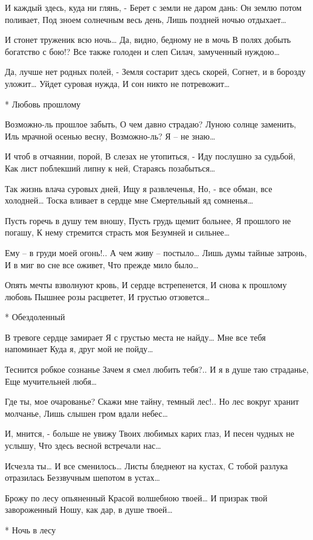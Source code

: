 И каждый здесь, куда ни глянь, -
Берет с земли не даром дань:
Он землю потом поливает,
Под зноем солнечным весь день,
Лишь поздней ночью отдыхает…

И стонет труженик всю ночь…
Да, видно, бедному не в мочь
В полях добыть богатство с бою!?
Все также голоден и слеп
Силач, замученный нуждою…

Да, лучше нет родных полей, -
Земля состарит здесь скорей,
Согнет, и в борозду уложит…
Уйдет суровая нужда,
И сон никто не потревожит…


* Любовь прошлому

Возможно-ль прошлое забыть,
О чем давно страдаю?
Луною солнце заменить,
Иль мрачной осенью весну,
Возможно-ль? Я – не знаю…

И чтоб в отчаянии, порой,
В слезах не утопиться, -
Иду послушно за судьбой,
Как лист поблекший липну к ней,
Стараясь позабыться…

Так жизнь влача суровых дней,
Ищу я развлеченья,
Но, - все обман, все холодней…
Тоска вливает в сердце мне
Смертельный яд сомненья…

Пусть горечь в душу тем вношу,
Пусть грудь щемит больнее,
Я прошлого не погашу,
К нему стремится страсть моя
Безумней и сильнее…

Ему – в груди моей огонь!..
А чем живу – постыло…
Лишь думы тайные затронь,
И в миг во сне все оживет,
Что прежде мило было…

Опять мечты взволнуют кровь,
И сердце встрепенется,
И снова к прошлому любовь
Пышнее розы расцветет,
И грустью отзовется…


* Обездоленный

В тревоге сердце замирает
Я с грустью места не найду…
Мне все тебя напоминает
Куда я, друг мой не пойду…

Теснится робкое сознанье
Зачем я смел любить тебя?..
И я в душе таю страданье,
Еще мучительней любя…

Где ты, мое очарованье?
Скажи мне тайну, темный лес!..
Но лес вокруг хранит молчанье,
Лишь слышен гром вдали небес…

И, мнится, - больше не увижу
Твоих любимых карих глаз,
И песен чудных не услышу,
Что здесь весной встречали нас…

Исчезла ты… И все сменилось…
Листы бледнеют на кустах,
С тобой разлука отразилась
Беззвучным шепотом в устах…

Брожу по лесу опьяненный
Красой волшебною твоей…
И призрак твой завороженный
Ношу, как дар, в душе твоей…


* Ночь в лесу

